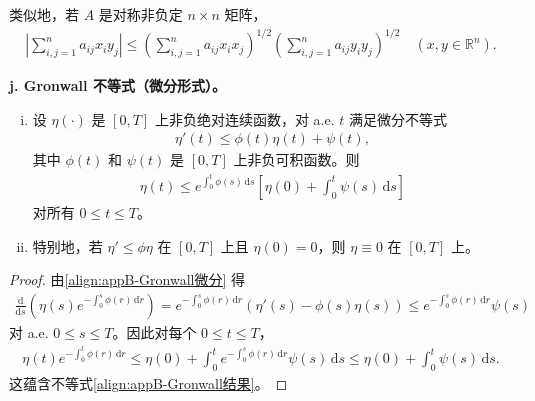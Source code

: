 \documentclass[../main.tex]{subfiles}
\begin{document}
\begin{remark}\label{remark:appB-矩阵CS}
类似地，若 $A$ 是对称非负定 $n\times n$ 矩阵，
\begin{align}
\left|\sum_{i,j=1}^n a_{ij}x_iy_j\right|\leqslant\left(\sum_{i,j=1}^n a_{ij}x_ix_j\right)^{1/2}\left(\sum_{i,j=1}^n a_{ij}y_iy_j\right)^{1/2} \quad (x,y\in\mathbb{R}^n).
\label{align:appB-矩阵CS}
\end{align}
\end{remark}

\textbf{j. Gronwall 不等式（微分形式）。}
\begin{enumerate}[(i)]
\item 设 $\eta(\cdot)$ 是 $[0,T]$ 上非负绝对连续函数，对 a.e. $t$ 满足微分不等式
\begin{align}
\eta'(t)\leqslant\phi(t)\eta(t)+\psi(t),
\label{align:appB-Gronwall微分}
\end{align}
其中 $\phi(t)$ 和 $\psi(t)$ 是 $[0,T]$ 上非负可积函数。则
\begin{align}
\eta(t)\leqslant e^{\int_0^t\phi(s)\,\mathrm{d}s}\left[\eta(0)+\int_0^t\psi(s)\,\mathrm{d}s\right]
\label{align:appB-Gronwall结果}
\end{align}
对所有 $0\leqslant t\leqslant T$。

\item 特别地，若 $\eta'\leqslant\phi\eta$ 在 $[0,T]$ 上且 $\eta(0)=0$，则 $\eta\equiv 0$ 在 $[0,T]$ 上。
\end{enumerate}

\begin{proof}
由\eqref{align:appB-Gronwall微分} 得
\begin{align*}
\frac{\mathrm{d}}{\mathrm{d}s}\left(\eta(s)e^{-\int_0^s\phi(r)\,\mathrm{d}r}\right)=e^{-\int_0^s\phi(r)\,\mathrm{d}r}(\eta'(s)-\phi(s)\eta(s))\leqslant e^{-\int_0^s\phi(r)\,\mathrm{d}r}\psi(s)
\end{align*}
对 a.e. $0\leqslant s\leqslant T$。因此对每个 $0\leqslant t\leqslant T$，
\begin{align*}
\eta(t)e^{-\int_0^t\phi(r)\,\mathrm{d}r}\leqslant\eta(0)+\int_0^t e^{-\int_0^s\phi(r)\,\mathrm{d}r}\psi(s)\,\mathrm{d}s\leqslant\eta(0)+\int_0^t\psi(s)\,\mathrm{d}s.
\end{align*}
这蕴含不等式\eqref{align:appB-Gronwall结果}。
\end{proof}
\end{document}
